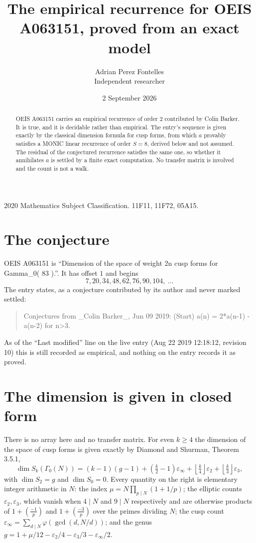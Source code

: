 \documentclass[11pt,a4paper]{article}
\title{The empirical recurrence for OEIS A063151, proved from an exact model}
\author{Adrian Perez Fontelles\\ \small Independent researcher}
\date{2 September 2026}
\theoremstyle{plain}
\theoremstyle{definition}
\begin{document}
\maketitle

\begin{abstract}
OEIS A063151 carries an empirical recurrence of order $2$ contributed by Colin Barker. It is true, and it is
decidable rather than empirical. The entry's sequence is given exactly by the classical dimension formula for cusp forms, from
which $a$ provably satisfies a MONIC linear recurrence of order $S=8$, derived below and not
assumed. The residual of the conjectured recurrence satisfies the same one, so whether it
annihilates $a$ is settled by a finite exact computation. No transfer matrix is involved and
the count is not a walk.
\end{abstract}

\noindent\small 2020 Mathematics Subject Classification. 11F11, 11F72, 05A15.\normalsize

\section{The conjecture}

OEIS A063151 is ``Dimension of the space of weight 2n cusp forms for Gamma\_0( 83 ).''. It has offset $1$ and begins
\[
7, 20, 34, 48, 62, 76, 90, 104,\ \dots
\]
The entry states, as a conjecture contributed by its author and never marked settled:
\begin{quote}
Conjectures from \_Colin Barker\_, Jun 09 2019: (Start) a(n) = 2*a(n-1) - a(n-2) for n>3.
\end{quote}
As of the ``Last modified'' line on the live entry (Aug 22 2019 12:18:12, revision 10)
this is still recorded as empirical, and nothing on the entry records it as proved.

\section{The dimension is given in closed form}

There is no array here and no transfer matrix. For even $k\ge4$ the dimension of the space of
cusp forms is given exactly by Diamond and Shurman, Theorem 3.5.1,
\[
\dim S_k(\Gamma_0(N))=(k-1)(g-1)+\left(\tfrac{k}{2}-1\right)\varepsilon_\infty
+\left\lfloor\tfrac{k}{4}\right\rfloor\varepsilon_2
+\left\lfloor\tfrac{k}{3}\right\rfloor\varepsilon_3 ,
\]
with $\dim S_2=g$ and $\dim S_0=0$. Every quantity on the right is elementary integer
arithmetic in $N$: the index $\mu=N\prod_{p\mid N}(1+1/p)$; the elliptic counts
$\varepsilon_2,\varepsilon_3$, which vanish when $4\mid N$ and $9\mid N$ respectively and are
otherwise products of $1+\left(\frac{-1}{p}\right)$ and $1+\left(\frac{-3}{p}\right)$
over the primes dividing $N$; the cusp count
$\varepsilon_\infty=\sum_{d\mid N}\varphi(\gcd(d,N/d))$; and the genus
$g=1+\mu/12-\varepsilon_2/4-\varepsilon_3/3-\varepsilon_\infty/2$.
\end{document}
